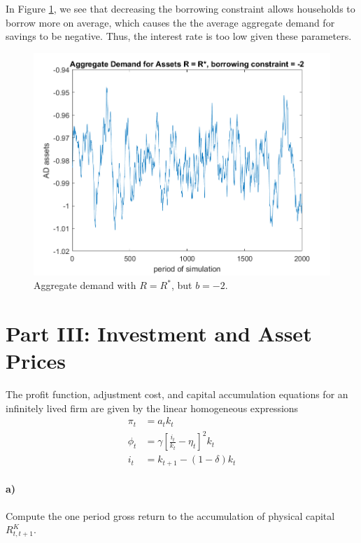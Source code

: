 \documentclass[12pt,letter]{article}
\begin{document}
In Figure \ref{fig:agg_demand_bconst}, we see that decreasing the borrowing constraint allows households to borrow more on average, which causes the the average aggregate demand for savings to be negative. Thus, the interest rate is too low given these parameters. 
\begin{figure}[H]
	\centering
	\includegraphics[scale=0.75]{aggregate_demand_bconst.png}
	\caption{Aggregate demand with $R=R^*$, but $b = -2$.}
	\label{fig:agg_demand_bconst}
\end{figure}
\section*{Part III: Investment and Asset Prices}
The profit function, adjustment cost, and capital accumulation equations for an infinitely lived firm are given by the linear homogeneous expressions
\begin{equation*}
	\begin{split}
	\pi_t &= a_tk_t\\
	\phi_t &= \gamma\left[\frac{i_t}{k_t}-\eta_t\right]^2k_t\\
	i_t &= k_{t+1} - (1-\delta)k_t
	\end{split}
\end{equation*}

\paragraph{a)} Compute the one period gross return to the accumulation of physical capital $R^K_{t, t+1}$. \\
\end{document}
